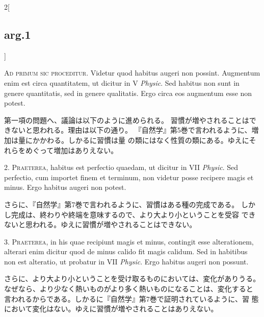 \documentclass[paper=a4paper,fontsize=10pt,jafontsize=9pt,titlepage]{jlreq}
\begin{document}
\begin{paracol}{2}[\subsection{arg.1}]

{\scshape Ad primum sic proceditur}. Videtur quod habitus augeri non
possint. Augmentum enim est circa quantitatem, ut dicitur in V
{\itshape Physic}. Sed habitus non sunt in genere quantitatis, sed in genere
qualitatis. Ergo circa eos augmentum esse non potest.

\switchcolumn

第一項の問題へ、議論は以下のように進められる。
習慣が増やされることはできないと思われる。理由は以下の通り。
『自然学』第5巻で言われるように、増加は量にかかわる。しかるに習慣は量
 の類にはなく性質の類にある。ゆえにそれらをめぐって増加はありえない。


2. {\scshape Praeterea}, habitus est perfectio quaedam, ut dicitur in VII
{\itshape Physic}. Sed perfectio, cum importet finem et terminum, non videtur
posse recipere magis et minus. Ergo habitus augeri non potest.

\switchcolumn

さらに、『自然学』第7巻で言われるように、習慣はある種の完成である。
しかし完成は、終わりや終端を意味するので、より大より小ということを受容
 できないと思われる。ゆえに習慣が増やされることはできない。


3. {\scshape Praeterea}, in his quae recipiunt magis et minus, contingit esse
alterationem, alterari enim dicitur quod de minus calido fit magis
calidum. Sed in habitibus non est alteratio, ut probatur in VII
{\itshape Physic}. Ergo habitus augeri non possunt.

\switchcolumn

さらに、より大より小ということを受け取るものにおいては、変化がありうる。
なぜなら、より少なく熱いものがより多く熱いものになることは、変化すると
言われるからである。しかるに『自然学』第7巻で証明されているように、習
態において変化はない。ゆえに習慣が増やされることはありえない。


\end{paracol}
\end{document}
